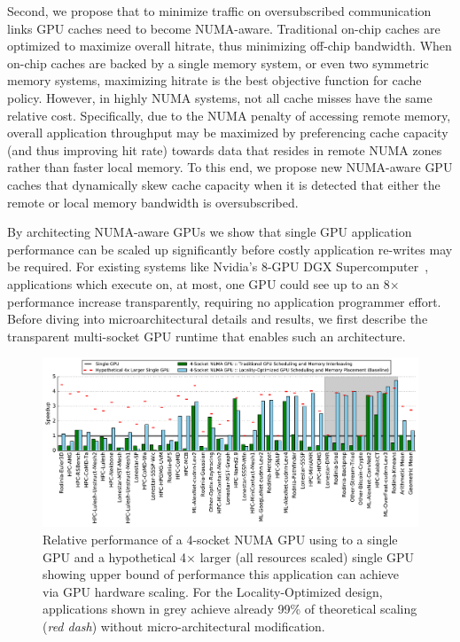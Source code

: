 Second, we propose that to minimize traffic on oversubscribed communication 
links GPU caches need to become NUMA-aware.  Traditional on-chip caches are 
optimized to maximize overall hitrate, thus minimizing off-chip bandwidth.  When 
on-chip caches are backed by a single memory system, or even two symmetric 
memory systems, maximizing hitrate is the best objective function for cache 
policy.  However, in highly NUMA systems,  not all cache misses have the same 
relative cost.  Specifically, due to the NUMA penalty of accessing remote 
memory, overall application throughput may be maximized by preferencing cache 
capacity (and thus improving hit rate) towards data that resides in remote NUMA 
zones rather than faster local memory. To this end, we propose new NUMA-aware 
GPU caches that dynamically skew cache capacity when it is detected that either 
the remote or local memory bandwidth is oversubscribed.

By architecting NUMA-aware GPUs we show that single GPU application performance 
can be scaled up significantly before costly application re-writes may be 
required. For existing systems like Nvidia's 8-GPU DGX 
Supercomputer~\cite{dgx}, applications which execute on, at most, one GPU could 
see up to an 8$\times$ performance increase transparently, requiring no 
application programmer effort. Before diving into microarchitectural details and 
results, we first describe the transparent multi-socket GPU runtime that enables 
such an architecture.

\begin{figure}[tp] 
    \centering
    \includegraphics[width=1.0\linewidth]{figures/plot_different_baselines.pdf}
    \caption{Relative performance of a 4-socket NUMA GPU using to a single GPU 
and a hypothetical 4$\times$ larger (all resources scaled) single GPU showing 
upper bound of performance this application can achieve via GPU hardware 
scaling. For the Locality-Optimized design, applications shown in grey 
achieve already 99\% of theoretical scaling (\emph{red dash}) without 
micro-architectural modification.}
    \label{fig:motivation}
    \vspace{-.2in}
\end{figure}
